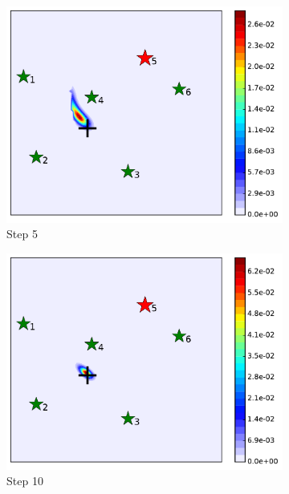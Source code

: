 \documentclass[journal]{IEEEtranTIE}
\theoremstyle{remark}
\begin{document}
\begin{figure}
\begin{subfigure}{0.23\textwidth}
		\includegraphics[width=\textwidth]{figures/hetero_sta_sen_sta_tar_rbt5_step5}
		\caption{Step 5}\label{fig:htr_sta_sen_sta_tar_sing3}
	\end{subfigure}
	\begin{subfigure}{0.23\textwidth}%
		\includegraphics[width=\textwidth]{figures/hetero_sta_sen_sta_tar_rbt5_step10}
		\caption{Step 10}\label{fig:htr_sta_sen_sta_tar_sing4}
	\end{subfigure}
	\begin{subfigure}{0.23\textwidth}%

\end{subfigure}
\end{figure}
\end{document}
